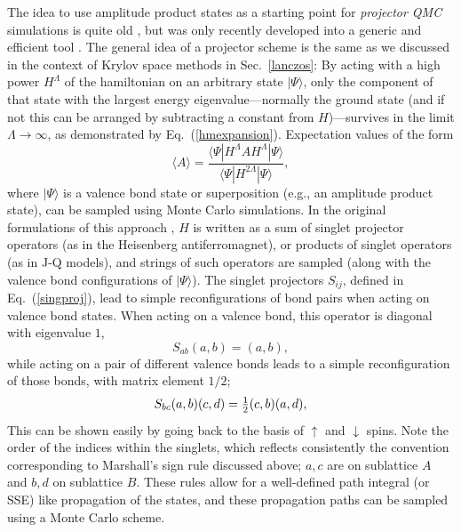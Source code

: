 \documentclass[draft,numberedheadings]{aipproc}
\newcommand{\dn}{\downarrow}
\newcommand{\up}{\uparrow}
\newcommand{\half}{\hbox{$\frac{1}{2}$}}
\begin{document}
The idea to use amplitude product states as a starting point for {\it projector QMC} simulations is quite old \cite{liang90b,santoro99}, but was only recently 
developed into a generic and efficient tool \cite{vbmethod1,vbmethod2,awshg}. The general idea of a projector scheme is the same as we discussed in the context 
of Krylov space methods in Sec.~\ref{lanczos}: By acting with a high power $H^\Lambda$ of the hamiltonian on an arbitrary state $|\Psi\rangle$, only the 
component of that state with the largest energy eigenvalue---normally the ground state (and if not this can be arranged by subtracting a constant from 
$H$)---survives in the limit $\Lambda \to \infty$, as demonstrated by Eq.~(\ref{hmexpansion}). Expectation values of the form 
\begin{equation}
\langle A\rangle = \frac{\langle \Psi|H^\Lambda A H^\Lambda |\Psi\rangle}{\langle \Psi|H^{2\Lambda} |\Psi\rangle},
\end{equation}
where $|\Psi\rangle$ is a valence bond state or superposition (e.g., an amplitude product state), can be sampled using Monte Carlo simulations. In
the original formulations of this approach \cite{liang90,vbmethod1}, $H$ is written as a sum of singlet projector operators (as in the Heisenberg 
antiferromagnet), or products of singlet operators (as in J-Q models), and strings of such operators are sampled (along with the valence bond
configurations of $|\Psi\rangle$). The singlet projectors $S_{ij}$, defined in Eq.~(\ref{singproj}), lead to simple reconfigurations of bond pairs 
when acting on valence bond states. When acting on a valence bond, this operator is diagonal with eigenvalue $1$,
\begin{equation}
S_{ab}(a,b)=(a,b),
\label{cijdia}
\end{equation} 
while acting on a pair of different valence bonds leads to a simple reconfiguration of those bonds, with matrix element $1/2$;
\begin{equation}
S_{bc}(a,b)(c,d)=\half (c,b)(a,d),
\label{cijop}
\end{equation}
This can be shown easily by going back to the basis of $\up$ and $\dn$ spins. Note the order of the indices within the singlets, which reflects 
consistently the convention corresponding to Marshall's sign rule discussed above; $a,c$ are on sublattice $A$ and $b,d$ on sublattice $B$.
These rules allow for a well-defined path integral (or SSE) like propagation of the states, and these propagation paths can be sampled using
a Monte Carlo scheme.
\end{document}

